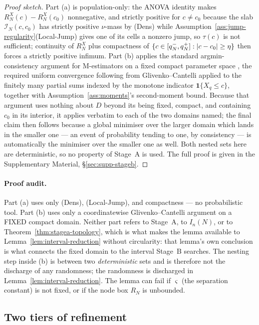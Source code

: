 \documentclass[11pt]{article}
\theoremstyle{plain}
\theoremstyle{definition}
\theoremstyle{remark}
\DeclarePairedDelimiter{\abs}{\lvert}{\rvert}
\begin{document}
\begin{proof}[Proof sketch]
Part (a) is population-only: the ANOVA identity makes
$R_N^X(c)-R_N^X(c_0)$ nonnegative, and strictly positive for $c\ne c_0$
because the slab $\mathcal I_N(c,c_0)$ has strictly positive $\nu$-mass by
(Dens) while Assumption~\ref{ass:jump-regularity}(Local-Jump) gives one of its
cells a nonzero jump, so $\tau(c)$
is not sufficient; continuity of $R_N^X$ plus compactness of
$\{c\in[q_N^-,q_N^+]:\abs{c-c_0}\ge\eta\}$ then forces a strictly positive
infimum. Part (b) applies the standard argmin-consistency argument for
M-estimators on a fixed compact parameter space \citep{vandervaart1998}, the
required
uniform convergence following from Glivenko--Cantelli applied to the finitely
many partial sums indexed by the monotone indicator $\mathbf 1\{X_q\le c\}$,
together with Assumption~\ref{ass:moments}'s second-moment bound. Because that
argument uses nothing about $D$ beyond its being fixed, compact, and
containing $c_0$ in its interior, it applies verbatim to each of the two
domains named; the final claim then follows because a global minimiser over
the larger domain which lands in the smaller one --- an event of probability
tending to one, by consistency --- is automatically the minimiser over the
smaller one as well. Both nested sets here are deterministic, so no property
of Stage~A is used. The full proof is
given in the Supplementary Material, \S\ref{sec:supp-stageb}.
\end{proof}

\paragraph{Proof audit.} Part (a) uses only (Dens), (Local-Jump), and
compactness --- no probabilistic tool. Part (b) uses only a
coordinatewise Glivenko--Cantelli argument on a FIXED compact domain. Neither
part refers to Stage~A, to $I_n(N)$, or to
Theorem~\ref{thm:stagea-topology}, which is what makes the lemma available to
Lemma~\ref{lem:interval-reduction} without circularity: that lemma's own
conclusion is what connects the fixed domain to the interval Stage~B
searches. The nesting step inside (b) is between two \emph{deterministic}
sets and is therefore not the discharge of any randomness; the randomness is
discharged in Lemma~\ref{lem:interval-reduction}. The lemma can fail if
$\varsigma$ (the separation constant) is not fixed, or if the node box $R_N$
is unbounded.

\subsection{Two tiers of refinement}\label{sec:stageb-tiers}
\end{document}
